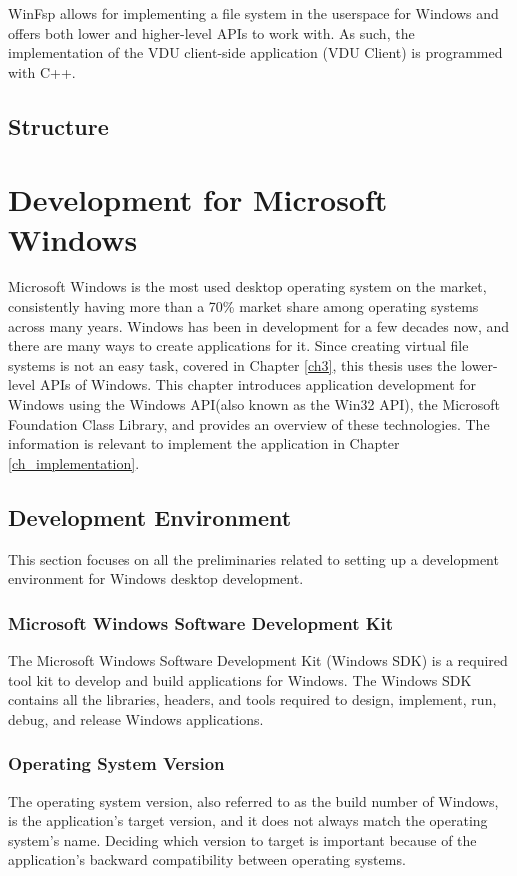 WinFsp\cite{WinFsp} allows for implementing a file system in the userspace for Windows and offers both lower and higher-level APIs to work with. As such, the implementation of the VDU client-side application (VDU Client) is programmed with C++. 

\section{Structure}

\chapter{Development for Microsoft Windows}
\label{ch2}

Microsoft Windows is the most used desktop operating system on the market, consistently having more than a 70\% market share among operating systems across many years\cite{DesktopOSStats}. Windows has been in development for a few decades now, and there are many ways to create applications for it. Since creating virtual file systems is not an easy task, covered in Chapter \ref{ch3}, this thesis uses the lower-level APIs of Windows. 
This chapter introduces application development for Windows using the Windows API(also known as the Win32 API), the Microsoft Foundation Class Library, and provides an overview of these technologies. The information is relevant to implement the application in Chapter \ref{ch_implementation}.

\section{Development Environment}
This section focuses on all the preliminaries related to setting up a development environment for Windows desktop development.

\subsection{Microsoft Windows Software Development Kit}
The Microsoft Windows Software Development Kit (Windows SDK) is a required tool kit to develop and build applications for Windows. The Windows SDK contains all the libraries, headers, and tools required to design, implement, run, debug, and release Windows applications.

\subsection{Operating System Version}
The operating system version, also referred to as the build number of Windows, is the application's target version, and it does not always match the operating system's name. Deciding which version to target is important because of the application's backward compatibility between operating systems.\cite{OsVersion} 

